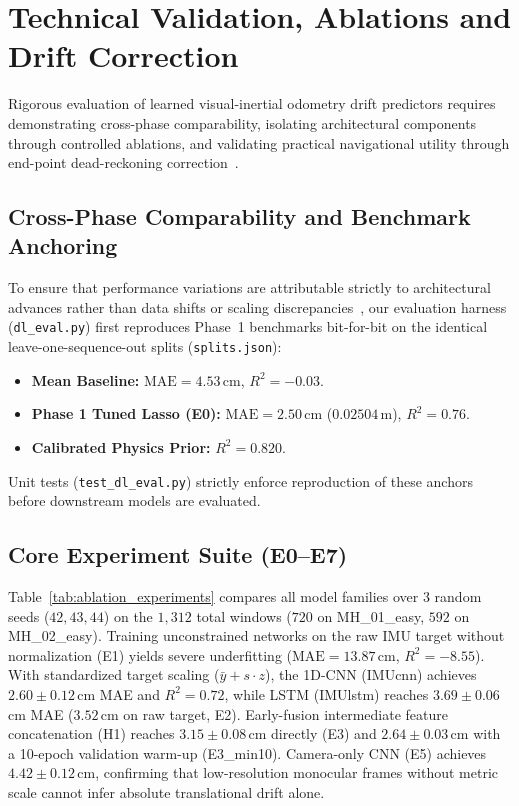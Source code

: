 \section{Technical Validation, Ablations and Drift Correction}
\label{sec:validation}

Rigorous evaluation of learned visual-inertial odometry drift predictors requires demonstrating cross-phase comparability, isolating architectural components through controlled ablations, and validating practical navigational utility through end-point dead-reckoning correction~\cite{r5sturm2012,r5zhang2018}.

\subsection{Cross-Phase Comparability and Benchmark Anchoring}
To ensure that performance variations are attributable strictly to architectural advances rather than data shifts or scaling discrepancies~\cite{r5melis2018}, our evaluation harness (\texttt{dl\_eval.py}) first reproduces Phase~1 benchmarks bit-for-bit on the identical leave-one-sequence-out splits (\texttt{splits.json}):
\begin{itemize}
    \item \textbf{Mean Baseline:} $\mathrm{MAE} = 4.53$\,cm, $R^2 = -0.03$.
    \item \textbf{Phase 1 Tuned Lasso (E0):} $\mathrm{MAE} = 2.50$\,cm ($0.02504$\,m), $R^2 = 0.76$.
    \item \textbf{Calibrated Physics Prior:} $R^2 = 0.820$.
\end{itemize}
Unit tests (\texttt{test\_dl\_eval.py}) strictly enforce reproduction of these anchors before downstream models are evaluated.

\subsection{Core Experiment Suite (E0--E7)}
Table~\ref{tab:ablation_experiments} compares all model families over 3 random seeds ($42, 43, 44$) on the $1{,}312$ total windows ($720$ on MH\_01\_easy, $592$ on MH\_02\_easy). Training unconstrained networks on the raw IMU target without normalization (E1) yields severe underfitting ($\mathrm{MAE} = 13.87$\,cm, $R^2 = -8.55$). With standardized target scaling ($\bar{y} + s \cdot z$), the 1D-CNN (IMUcnn) achieves $2.60 \pm 0.12$\,cm MAE and $R^2 = 0.72$, while LSTM (IMUlstm) reaches $3.69 \pm 0.06$\,cm MAE ($3.52$\,cm on raw target, E2). Early-fusion intermediate feature concatenation (H1) reaches $3.15 \pm 0.08$\,cm directly (E3) and $2.64 \pm 0.03$\,cm with a 10-epoch validation warm-up (E3\_min10). Camera-only CNN (E5) achieves $4.42 \pm 0.12$\,cm, confirming that low-resolution monocular frames without metric scale cannot infer absolute translational drift alone.


